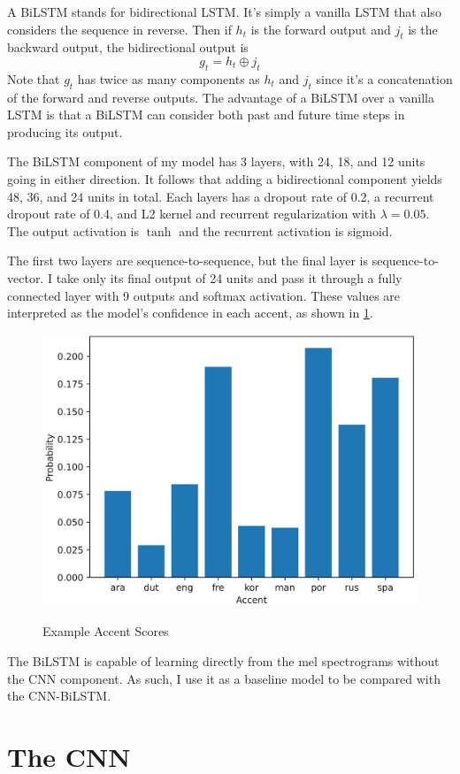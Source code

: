 \documentclass[11pt,a4paper]{article}
\begin{document}
A BiLSTM stands for bidirectional LSTM. It's simply a vanilla LSTM that also considers the sequence in reverse. Then if \(h_t\) is the forward output and \(j_t\) is the backward output, the bidirectional output is
\begin{equation}
  g_t = h_t \oplus j_t
\end{equation}
Note that \(g_t\) has twice as many components as \(h_t\) and \(j_t\) since it's a concatenation of the forward and reverse outputs. The advantage of a BiLSTM over a vanilla LSTM is that a BiLSTM can consider both past and future time steps in producing its output.

The BiLSTM component of my model has 3 layers, with 24, 18, and 12 units going in either direction. It follows that adding a bidirectional component yields 48, 36, and 24 units in total. Each layers has a dropout rate of 0.2, a recurrent dropout rate of 0.4, and L2 kernel and recurrent regularization with \(\lambda = 0.05\). The output activation is \(\tanh\) and the recurrent activation is sigmoid.

The first two layers are sequence-to-sequence, but the final layer is sequence-to-vector. I take only its final output of 24 units and pass it through a fully connected layer with 9 outputs and softmax activation. These values are interpreted as the model's confidence in each accent, as shown in \cref{fig:proba}.
\begin{figure}[h]
  \centering
  \caption{Example Accent Scores}
  \includegraphics[width=.48\textwidth]{proba.png}
  \label{fig:proba}
\end{figure}

The BiLSTM is capable of learning directly from the mel spectrograms without the CNN component. As such, I use it as a baseline model to be compared with the CNN-BiLSTM.

\section{The CNN} \label{sec:cnn}
\end{document}
